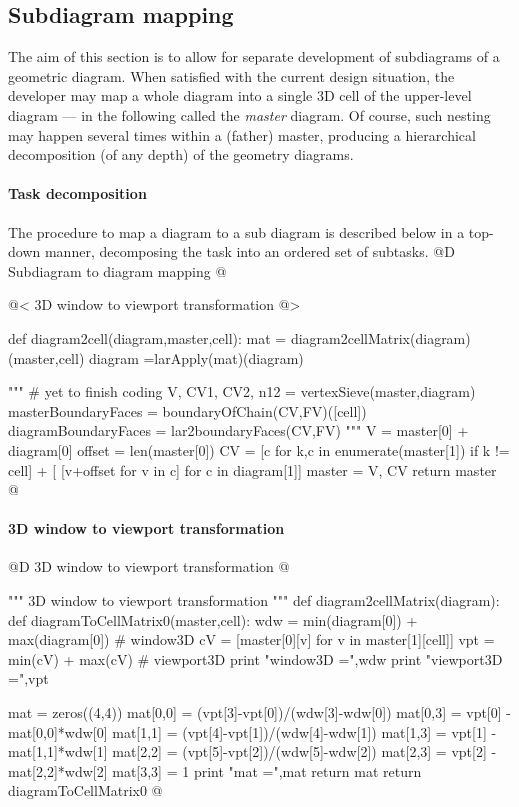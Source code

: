\documentclass[11pt,oneside]{article}	%
\begin{document}
\subsection{Subdiagram mapping}

The aim of this section is to allow for separate development of subdiagrams of a geometric diagram.
When satisfied with the current design situation,  the developer may map a whole diagram into a single 3D cell of the upper-level diagram --- in the following called the \emph{master} diagram.
Of course, such nesting may happen several times within a (father) master, producing a hierarchical decomposition (of any depth) of the geometry diagrams.


\paragraph{Task decomposition}
The procedure to map a diagram to a sub diagram is described below in a top-down manner,
decomposing the task into an ordered set of subtasks.
@D Subdiagram to diagram mapping
@{
@< 3D window to viewport transformation @>

def diagram2cell(diagram,master,cell):
	mat = diagram2cellMatrix(diagram)(master,cell)
	diagram =larApply(mat)(diagram)	
	
	"""
	# yet to finish coding
	V, CV1, CV2, n12 = vertexSieve(master,diagram)
	masterBoundaryFaces = boundaryOfChain(CV,FV)([cell])
	diagramBoundaryFaces = lar2boundaryFaces(CV,FV)
	"""
	V = master[0] + diagram[0]
	offset = len(master[0])
	CV = [c for k,c in enumerate(master[1]) if k != cell] + [
			[v+offset for v in c] for c in diagram[1]]
	master = V, CV
	return master
@}

\paragraph{3D window to viewport transformation}
@D 3D window to viewport transformation
@{""" 3D window to viewport transformation """
def diagram2cellMatrix(diagram):
	def diagramToCellMatrix0(master,cell):
		wdw = min(diagram[0]) + max(diagram[0])			# window3D
		cV = [master[0][v] for v in master[1][cell]]
		vpt = min(cV) + max(cV)								# viewport3D
		print "\n window3D =",wdw
		print "\n viewport3D =",vpt
		
		mat = zeros((4,4))
		mat[0,0] = (vpt[3]-vpt[0])/(wdw[3]-wdw[0])
		mat[0,3] = vpt[0] - mat[0,0]*wdw[0]
		mat[1,1] = (vpt[4]-vpt[1])/(wdw[4]-wdw[1])
		mat[1,3] = vpt[1] - mat[1,1]*wdw[1]
		mat[2,2] = (vpt[5]-vpt[2])/(wdw[5]-wdw[2])
		mat[2,3] = vpt[2] - mat[2,2]*wdw[2]
		mat[3,3] = 1
		print "\n mat =",mat
		return mat
	return diagramToCellMatrix0
@}
\end{document}
